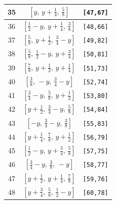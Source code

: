 \documentclass[fleqn,8pt]{jsarticle}
\begin{document}
\begin{longtable}{ccc}
35 & $\left[ y,\, y + \frac{1}{4},\, \frac{5}{8} \right]$ & {\tt [47,67]} \\ \hline
36 & $\left[ \frac{1}{2} - y,\, y + \frac{1}{4},\, \frac{3}{8} \right]$ & {\tt [48,66]} \\ \hline
37 & $\left[ \frac{5}{8},\, y + \frac{1}{2},\, \frac{3}{4} - y \right]$ & {\tt [49,82]} \\ \hline
38 & $\left[ \frac{5}{8},\, \frac{1}{2} - y,\, y + \frac{3}{4} \right]$ & {\tt [50,81]} \\ \hline
39 & $\left[ \frac{7}{8},\, y + \frac{1}{2},\, y + \frac{1}{4} \right]$ & {\tt [51,73]} \\ \hline
40 & $\left[ \frac{3}{8},\, - y,\, \frac{3}{4} - y \right]$ & {\tt [52,74]} \\ \hline
41 & $\left[ \frac{3}{4} - y,\, \frac{5}{8},\, y + \frac{1}{2} \right]$ & {\tt [53,80]} \\ \hline
42 & $\left[ y + \frac{1}{2},\, \frac{3}{4} - y,\, \frac{5}{8} \right]$ & {\tt [54,84]} \\ \hline
43 & $\left[ - y,\, \frac{3}{4} - y,\, \frac{3}{8} \right]$ & {\tt [55,83]} \\ \hline
44 & $\left[ y + \frac{1}{4},\, \frac{7}{8},\, y + \frac{1}{2} \right]$ & {\tt [56,79]} \\ \hline
45 & $\left[ \frac{1}{2} - y,\, y + \frac{3}{4},\, \frac{5}{8} \right]$ & {\tt [57,75]} \\ \hline
46 & $\left[ \frac{3}{4} - y,\, \frac{3}{8},\, - y \right]$ & {\tt [58,77]} \\ \hline
47 & $\left[ y + \frac{1}{2},\, y + \frac{1}{4},\, \frac{7}{8} \right]$ & {\tt [59,76]} \\ \hline
48 & $\left[ y + \frac{3}{4},\, \frac{5}{8},\, \frac{1}{2} - y \right]$ & {\tt [60,78]} \\
\end{longtable}
\renewcommand{\arraystretch}{1.2}
\end{document}
